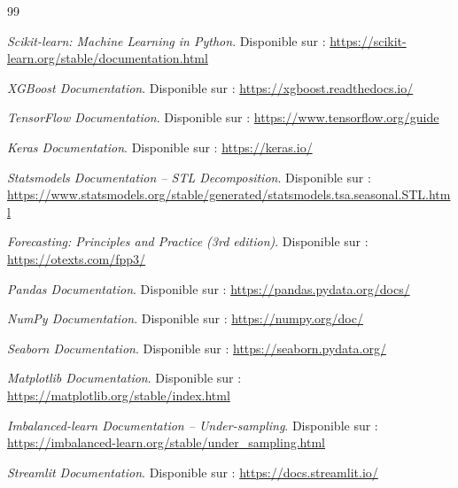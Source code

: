 \documentclass[a4paper,12pt, oneside]{article}
\begin{document}
\renewcommand{\refname}{Webographie}
\begin{thebibliography}{99}

\textit{Scikit-learn: Machine Learning in Python}. Disponible sur : \url{https://scikit-learn.org/stable/documentation.html}

\textit{XGBoost Documentation}. Disponible sur : \url{https://xgboost.readthedocs.io/}

\textit{TensorFlow Documentation}. Disponible sur : \url{https://www.tensorflow.org/guide}

\textit{Keras Documentation}. Disponible sur : \url{https://keras.io/}

\textit{Statsmodels Documentation -- STL Decomposition}. Disponible sur : \url{https://www.statsmodels.org/stable/generated/statsmodels.tsa.seasonal.STL.html}

\textit{Forecasting: Principles and Practice (3rd edition)}. Disponible sur : \url{https://otexts.com/fpp3/}

\textit{Pandas Documentation}. Disponible sur : \url{https://pandas.pydata.org/docs/}

\textit{NumPy Documentation}. Disponible sur : \url{https://numpy.org/doc/}

\textit{Seaborn Documentation}. Disponible sur : \url{https://seaborn.pydata.org/}

\textit{Matplotlib Documentation}. Disponible sur : \url{https://matplotlib.org/stable/index.html}

\textit{Imbalanced-learn Documentation -- Under-sampling}. Disponible sur : \url{https://imbalanced-learn.org/stable/under_sampling.html}

\textit{Streamlit Documentation}. Disponible sur : \url{https://docs.streamlit.io/}

\end{thebibliography}
\end{document}
